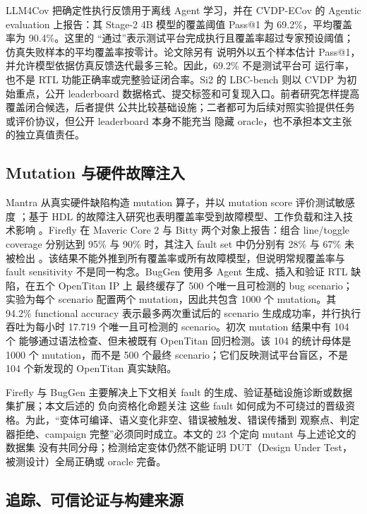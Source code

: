 \documentclass[UTF8,a4paper,zihao=-4,oneside]{ctexart}
\begin{document}
LLM4Cov 把确定性执行反馈用于离线 Agent 学习，并在 CVDP-ECov 的 Agentic evaluation 上报告：其
Stage-2 4B 模型的覆盖阈值 Pass@1 为 69.2\%，平均覆盖率为 90.4\%\cite{zhang2026llm4cov}。这里的
“通过”表示测试平台完成执行且覆盖率超过专家预设阈值；仿真失败样本的平均覆盖率按零计。论文除另有
说明外以五个样本估计 Pass@1，并允许模型依据仿真反馈迭代最多三轮。因此，69.2\% 不是测试平台可
运行率，也不是 RTL 功能正确率或完整验证闭合率。Si2 的 LBC-bench 则以 CVDP 为初始重点，公开 leaderboard
数据格式、提交标签和可复现入口\cite{si22026lbcbench}。前者研究怎样提高覆盖闭合候选，后者提供
公共比较基础设施；二者都可为后续对照实验提供任务或评价协议，但公开 leaderboard 本身不能充当
隐藏 oracle，也不承担本文主张的独立真值责任。

\subsection{Mutation 与硬件故障注入}

Mantra 从真实硬件缺陷构造 mutation 算子，并以 mutation score 评价测试敏感度
\cite{wu2023mantra}；基于 HDL 的故障注入研究也表明覆盖率受到故障模型、工作负载和注入技术影响
\cite{gil2003faultinjection}。Firefly 在 Maveric Core 2 与 Bitty 两个对象上报告：组合 line/toggle
coverage 分别达到 95\% 与 90\% 时，其注入 fault set 中仍分别有 28\% 与 67\% 未被检出
\cite{skakov2025firefly}。该结果不能外推到所有覆盖率或所有故障模型，但说明常规覆盖率与 fault
sensitivity 不是同一构念。BugGen 使用多 Agent 生成、插入和验证 RTL 缺陷，在五个 OpenTitan IP 上
最终缓存了 500 个唯一且可检测的 bug scenario；实验为每个 scenario 配置两个 mutation，因此共包含
1000 个 mutation\cite{jasper2025buggen}。其 94.2\% functional accuracy 表示最多两次重试后的 scenario
生成成功率，并行执行吞吐为每小时 17.719 个唯一且可检测的 scenario。初次 mutation 结果中有 104 个
能够通过语法检查、但未被既有 OpenTitan 回归检测。该 104 的统计母体是 1000 个 mutation，而不是
500 个最终 scenario；它们反映测试平台盲区，不是 104 个新发现的 OpenTitan 真实缺陷。

Firefly 与 BugGen 主要解决上下文相关 fault 的生成、验证基础设施诊断或数据集扩展；本文后述的
负向资格化命题关注
这些 fault 如何成为不可绕过的晋级资格。为此，“变体可编译、语义变化非空、错误被触发、错误传播到
观察点、判定器拒绝、campaign 完整”必须同时成立。本文的 23 个定向 mutant 与上述论文的数据集
没有共同分母；检测给定变体仍然不能证明 DUT（Design Under Test，被测设计）全局正确或 oracle 完备。

\subsection{追踪、可信论证与构建来源}
\end{document}
